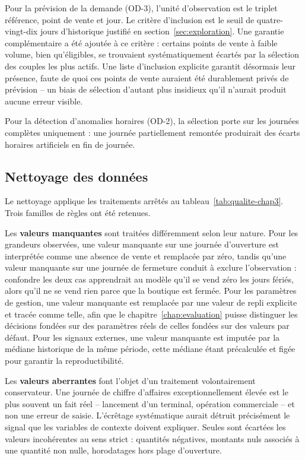Pour la prévision de la demande (OD-3), l'unité d'observation est le triplet référence, point de vente et jour. Le critère d'inclusion est le seuil de quatre-vingt-dix jours d'historique justifié en section~\ref{sec:exploration}. Une garantie complémentaire a été ajoutée à ce critère : certains points de vente à faible volume, bien qu'éligibles, se trouvaient systématiquement écartés par la sélection des couples les plus actifs. Une liste d'inclusion explicite garantit désormais leur présence, faute de quoi ces points de vente auraient été durablement privés de prévision -- un biais de sélection d'autant plus insidieux qu'il n'aurait produit aucune erreur visible.

Pour la détection d'anomalies horaires (OD-2), la sélection porte sur les journées complètes uniquement : une journée partiellement remontée produirait des écarts horaires artificiels en fin de journée.

\subsection{Nettoyage des données}

Le nettoyage applique les traitements arrêtés au tableau~\ref{tab:qualite-chap3}. Trois familles de règles ont été retenues.

Les \textbf{valeurs manquantes} sont traitées différemment selon leur nature. Pour les grandeurs observées, une valeur manquante sur une journée d'ouverture est interprétée comme une absence de vente et remplacée par zéro, tandis qu'une valeur manquante sur une journée de fermeture conduit à exclure l'observation : confondre les deux cas apprendrait au modèle qu'il se vend zéro les jours fériés, alors qu'il ne se vend rien parce que la boutique est fermée. Pour les paramètres de gestion, une valeur manquante est remplacée par une valeur de repli explicite et tracée comme telle, afin que le chapitre~\ref{chap:evaluation} puisse distinguer les décisions fondées sur des paramètres réels de celles fondées sur des valeurs par défaut. Pour les signaux externes, une valeur manquante est imputée par la médiane historique de la même période, cette médiane étant précalculée et figée pour garantir la reproductibilité.

Les \textbf{valeurs aberrantes} font l'objet d'un traitement volontairement conservateur. Une journée de chiffre d'affaires exceptionnellement élevée est le plus souvent un fait réel -- lancement d'un terminal, opération commerciale -- et non une erreur de saisie. L'écrêtage systématique aurait détruit précisément le signal que les variables de contexte doivent expliquer. Seules sont écartées les valeurs incohérentes au sens strict : quantités négatives, montants nuls associés à une quantité non nulle, horodatages hors plage d'ouverture.

